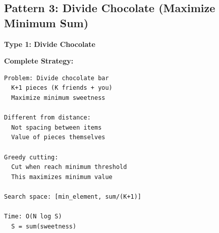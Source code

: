 \documentclass[11pt,a4paper,oneside]{book}
\begin{document}
\subsection{Pattern 3: Divide Chocolate (Maximize Minimum Sum)}

\begin{tcolorbox}[
    enhanced,breakable,
    colback=warnyellow!10,
    colframe=warnyellow,
    boxrule=2pt,
    arc=4mm,
    title=\textbf{Complete Maximize Minimum Sum Algorithms}
]
\textbf{Type 1: Divide Chocolate}

\textbf{Complete Strategy:}
\begin{verbatim}
Problem: Divide chocolate bar
  K+1 pieces (K friends + you)
  Maximize minimum sweetness

Different from distance:
  Not spacing between items
  Value of pieces themselves

Greedy cutting:
  Cut when reach minimum threshold
  This maximizes minimum value

Search space: [min_element, sum/(K+1)]

Time: O(N log S)
  S = sum(sweetness)
\end{verbatim}
\end{tcolorbox}
\end{document}
